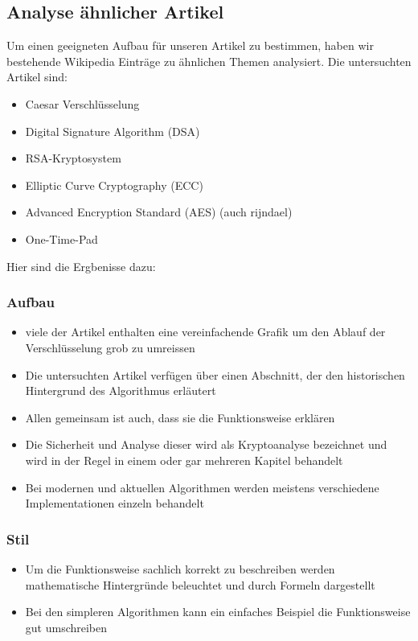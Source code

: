 \documentclass[11pt,paper=a4,final]{scrartcl}
\begin{document}
\subsection{Analyse \"ahnlicher Artikel}
Um einen geeigneten Aufbau f\"ur unseren Artikel zu bestimmen, haben wir
bestehende Wikipedia Eintr\"age zu \"ahnlichen Themen analysiert. Die
untersuchten Artikel sind:
\begin{itemize}
  \item Caesar Verschl\"usselung
  \item Digital Signature Algorithm (DSA)
  \item RSA-Kryptosystem 
  \item Elliptic Curve Cryptography (ECC)
  \item Advanced Encryption Standard (AES) (auch rijndael)
  \item One-Time-Pad
\end{itemize}
Hier sind die Ergbenisse dazu:

\subsubsection{Aufbau}
\begin{itemize}
  \item viele der Artikel enthalten eine vereinfachende Grafik um den Ablauf der
  Verschl\"usselung grob zu umreissen
  \item Die untersuchten Artikel verf\"ugen \"uber einen Abschnitt, der den
  historischen Hintergrund des Algorithmus erl\"autert
  \item Allen gemeinsam ist auch, dass sie die Funktionsweise erkl\"aren
  \item Die Sicherheit und Analyse dieser wird als Kryptoanalyse bezeichnet und
  wird in der Regel in einem oder gar mehreren Kapitel behandelt
  \item Bei modernen und aktuellen Algorithmen werden meistens verschiedene
  Implementationen einzeln behandelt
\end{itemize}
\subsubsection{Stil}
\begin{itemize}
  \item Um die Funktionsweise sachlich korrekt zu beschreiben werden
  mathematische Hintergr\"unde beleuchtet und durch Formeln dargestellt
  \item Bei den simpleren Algorithmen kann ein einfaches Beispiel die
  Funktionsweise gut umschreiben
\end{itemize}
\end{document}
